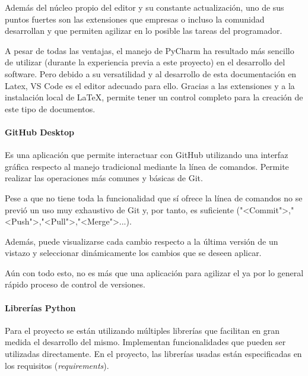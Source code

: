Además del núcleo propio del editor y su constante actualización, uno de sus
puntos fuertes son las extensiones que empresas o incluso la comunidad
desarrollan y que permiten agilizar en lo posible las tareas del programador.

A pesar de todas las ventajas, el manejo de PyCharm ha resultado más sencillo de
utilizar (durante la experiencia previa a este proyecto) en el desarrollo del
software. Pero debido a su versatilidad y al desarrollo de esta
documentación en Latex, VS Code es el editor adecuado para ello. Gracias a las
extensiones y a la instalación local de \LaTeX, permite tener un control completo
para la creación de este tipo de documentos. 


\paragraph{GitHub Desktop}
Es una aplicación que permite interactuar con GitHub utilizando una interfaz
gráfica respecto al manejo tradicional mediante la línea de comandos. Permite
realizar las operaciones más comunes y básicas de Git.

Pese a que no tiene toda la funcionalidad que sí ofrece la línea de comandos no
se previó un uso muy exhaustivo de Git y, por tanto, es suficiente
("<Commit">,"<Push">,"<Pull">,"<Merge">...).

Además, puede visualizarse cada cambio respecto a la última versión de un
vistazo y seleccionar dinámicamente los cambios que se deseen aplicar.

Aún con todo esto, no es más que una aplicación para agilizar el ya por lo
general rápido proceso de control de versiones.

\paragraph{Librerías Python}
Para el proyecto se están utilizando múltiples librerías que facilitan en gran
medida el desarrollo del mismo. Implementan funcionalidades que pueden ser
utilizadas directamente. En el proyecto, las librerías usadas están
especificadas en los requisitos (\textit{requirements}).

